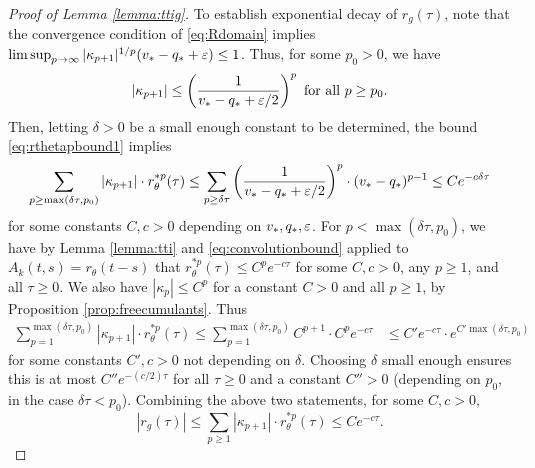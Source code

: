 \begin{proof}[Proof of Lemma \ref{lemma:ttig}]
To establish exponential decay of $r_g(\tau)$, note that the convergence
condition of \eqref{eq:Rdomain} implies
$\limsup_{p \to \infty} |\kappa_{p+1}|^{1/p}(v_*-q_*+\varepsilon) \leq 1$.
Thus, for some $p_0>0$, we have
\begin{equation}\label{eq:p0def}
|\kappa_{p+1}| \leq \left(\frac{1}{v_*-q_*+\varepsilon/2}\right)^p \text{ for all }
p \geq p_0.
\end{equation}
Then, letting $\delta>0$ be a small enough constant to be determined,
the bound \eqref{eq:rthetapbound1} implies
\[\sum_{p \geq \max(\delta\tau,p_0)} |\kappa_{p+1}|
\cdot r_\theta^{*p}(\tau) \leq \sum_{p \geq \delta\tau}
\left(\frac{1}{v_*-q_*+\varepsilon/2}\right)^p
\cdot (v_*-q_*)^{p-1} \leq Ce^{-c\delta\tau}\]
for some constants $C,c>0$ depending on $v_*,q_*,\varepsilon$. For
$p<\max(\delta\tau,p_0)$, we have by Lemma \ref{lemma:tti} and
\eqref{eq:convolutionbound} applied to $A_k(t,s)=r_\theta(t-s)$
that $r_\theta^{*p}(\tau) \leq C^p e^{-c\tau}$
for some $C,c>0$, any $p \geq 1$, and all $\tau \geq 0$.
We also have $|\kappa_p| \leq C^p$ for a constant $C>0$ and all
$p \geq 1$, by Proposition \ref{prop:freecumulants}. Thus
\begin{align*}
\sum_{p=1}^{\max(\delta\tau,p_0)}
|\kappa_{p+1}| \cdot r_\theta^{*p}(\tau)
\leq \sum_{p=1}^{\max(\delta\tau,p_0)}
C^{p+1} \cdot C^pe^{-c\tau}
&\leq C'e^{-c\tau} \cdot e^{C'\max(\delta \tau,p_0)}
\end{align*}
for some constants $C',c>0$ not depending on $\delta$. Choosing $\delta$
small enough ensures this is at most $C''e^{-(c/2)\tau}$ for all $\tau \geq 0$
and a constant $C''>0$ (depending on $p_0$, in the case $\delta\tau<p_0$). Combining the above two statements, for some $C,c>0$,
\begin{equation}\label{eq:rgdecayproof}
|r_g(\tau)|\leq \sum_{p \geq 1} |\kappa_{p+1}| \cdot r_\theta^{*p}(\tau)
\leq Ce^{-c\tau}.
\end{equation}


\end{proof}
